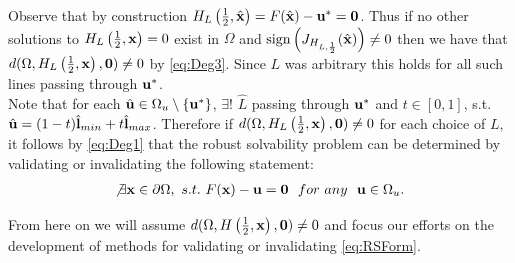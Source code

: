 \documentclass[11pt]{article}
\theoremstyle{plain}
\theoremstyle{definition}
\theoremstyle{remark}
\begin{document}
Observe that by construction $H_L\left(\frac{1}{2},\hat{\bold x}\right)=F(\hat{\bold x})-\bold u^*=\textbf{0}$. 
Thus if no other solutions to $H_L\left(\frac{1}{2},\bold x\right)=0$ exist in $\Omega$ and $\operatorname{sign}\left(J_{H_{L,\frac{1}{2}}}(\hat{\bold x})\right)\neq 0$ then we have that $d(\Omega,H_L\left(\frac{1}{2},\bold x\right),\textbf{0})\neq 0$ by \ref{eq:Deg3}. 
Since $L$ was arbitrary this holds for all such lines passing through $\bold u^*$.\\
Note that for each $\hat{\bold u}\in\Omega_u\setminus\{\bold u^*\}$, $\exists !$ $\hat{L}$ passing through $\bold u^*$ and $t\in[0,1]$,  s.t. $\hat{\bold u}=(1-t)\hat{\bold l}_{min}+t\hat{\bold l}_{max}$. 
Therefore if $d(\Omega,H_L\left(\frac{1}{2},\bold x\right),\bold 0)\neq 0$ for each choice of $L$, it follows by \ref{eq:Deg1} that the robust solvability problem can be determined by validating or invalidating the following statement:
\begin{align}
\not\exists \bold x\in\partial\Omega, \ s.t. \ F(\bold x)-\bold u=\bold 0	 \ \ for \ any \ \ \bold u\in\Omega_u. \label{eq:RSForm}
\end{align}

From here on we will assume $d(\Omega,H\left(\frac{1}{2},\bold x\right),\bold 0)\neq 0$ and focus our efforts on the development of methods for validating or invalidating \ref{eq:RSForm}.\\
\end{document}
